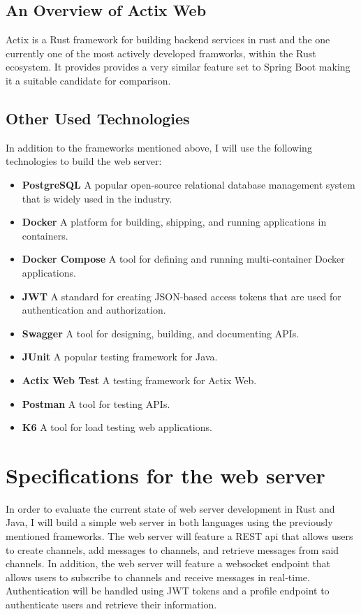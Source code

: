 \documentclass[a4paper,12pt]{article}
\begin{document}
	\subsection{An Overview of Actix Web}
	\label{subsec:actix_web}
	Actix is a Rust framework for building backend services in rust and the one currently one of the most actively developed framworks,
	within the Rust ecosystem. It provides provides a very similar feature set to Spring Boot making it a suitable candidate for comparison.

	\newpage
	\subsection{Other Used Technologies}
	\label{subsec:used_technologies}
	In addition to the frameworks mentioned above, I will use the following technologies to build the web server:
	\begin{itemize}
		\item \textbf{PostgreSQL} \- A popular open-source relational database management system that is widely used in the industry.
		\item \textbf{Docker} \- A platform for building, shipping, and running applications in containers.
		\item \textbf{Docker Compose} \- A tool for defining and running multi-container Docker applications.
		\item \textbf{JWT} \- A standard for creating JSON-based access tokens that are used for authentication and authorization.
		\item \textbf{Swagger} \- A tool for designing, building, and documenting APIs.
		\item \textbf{JUnit} \- A popular testing framework for Java.
		\item \textbf{Actix Web Test} \- A testing framework for Actix Web.
		\item \textbf{Postman} \- A tool for testing APIs.
		\item \textbf{K6} \- A tool for load testing web applications.
	\end{itemize}

	\newpage
	\section{Specifications for the web server}
	\label{sec:example_project}
	In order to evaluate the current state of web server development in Rust and Java, I will build a simple web server in both languages
	using the previously mentioned frameworks. The web server will feature a REST api that allows users to create channels, add messages to channels,
	and retrieve messages from said channels. In addition, the web server will feature a websocket endpoint that allows users to subscribe to channels
	and receive messages in real-time. Authentication will be handled using JWT tokens and a profile endpoint to authenticate users
	and retrieve their information.
\end{document}
